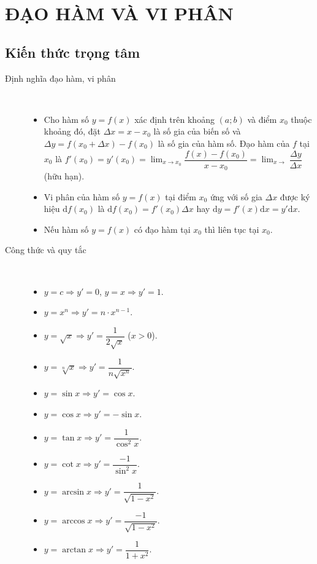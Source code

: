 \section{ĐẠO HÀM VÀ VI PHÂN} %
\subsection{Kiến thức trọng tâm}
\begin{description}
	\item[Định nghĩa đạo hàm, vi phân]\
    \begin{itemize}
        \item Cho hàm số $y=f(x)$ xác định trên khoảng $(a;b)$ và điểm $x_0$ thuộc khoảng đó, đặt $\Delta x=x-x_0$ là số gia của biến số và $\Delta y=f(x_0+\Delta x)-f(x_0)$ là số gia của hàm số. Đạo hàm của $f$ tại $x_0$ là $\displaystyle f'(x_0)=y'(x_0)=\lim_{x\rightarrow x_0}\dfrac{f(x)-f(x_0)}{x-x_0}=\lim_{x\rightarrow}\dfrac{\Delta y}{\Delta x}$ (hữu hạn).
        \item Vi phân của hàm số $y=f(x)$ tại điểm $x_0$ ứng với số gia $\Delta x$ được ký hiệu $\mathrm{d}f(x_0)$ là $\mathrm{d}f(x_0)=f'(x_0)\Delta x$ hay $\mathrm{d}y=f'(x)\mathrm{d}x=y'\mathrm{d}x$.
        \item Nếu hàm số $y=f(x)$ có đạo hàm tại $x_0$ thì liên tục tại $x_0$.
    \end{itemize}
	\item[Công thức và quy tắc]\
	\begin{multicols}{2}
	\begin{itemize}
	    \item $y=c\Rightarrow y'=0$, $y=x\Rightarrow y'=1$.
	    \item $y=x^n\Rightarrow y'=n\cdot x^{n-1}$.
	    \item $y=\sqrt{x}\Rightarrow y'=\dfrac{1}{2\sqrt{x}}$ ($x>0$).
	    \item $y=\sqrt[n]{x}\Rightarrow y'=\dfrac{1}{n\sqrt{x^n}}$.
	    \item $y=\sin x\Rightarrow y'=\cos x$.
	    \item $y=\cos x\Rightarrow y'=-\sin x$.
	    \item $y=\tan x\Rightarrow y'=\dfrac{1}{\cos^2 x}$.
	    \item $y=\cot x\Rightarrow y'=\dfrac{-1}{\sin^2 x}$.
	    \item $y=\arcsin x\Rightarrow y'=\dfrac{1}{\sqrt{1-x^2}}$.
	    \item $y=\arccos x\Rightarrow y'=\dfrac{-1}{\sqrt{1-x^2}}$.
	    \item $y=\arctan x\Rightarrow y'=\dfrac{1}{1+x^2}$.

\end{itemize}
\end{multicols}
\end{description}
